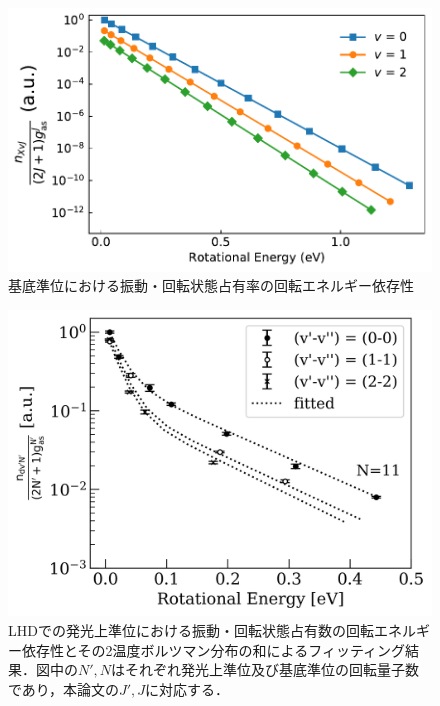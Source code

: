\begin{figure}
    \centering
    \includegraphics[width=15cm]{pictures/ground-state-n.pdf}
    \caption{基底準位における振動・回転状態占有率の回転エネルギー依存性}
    \label{fig:ground-state-n}
\end{figure}

\begin{figure}
    \centering
    \includegraphics[width=15cm]{pictures/ishihara-upper-boltzmann.png}
    \caption[LHDでの発光上準位における振動・回転状態占有数の回転エネルギー依存性とその2温度ボルツマン分布の和によるフィッティング結果\cite{ishihara}]{LHDでの発光上準位における振動・回転状態占有数の回転エネルギー依存性とその2温度ボルツマン分布の和によるフィッティング結果\cite{ishihara}．図中の$N', N$はそれぞれ発光上準位及び基底準位の回転量子数であり，本論文の$J', J$に対応する．}
    \label{fig:ishihara-upper-boltzmann}
\end{figure}
